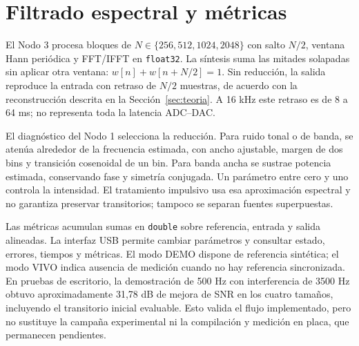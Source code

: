 \section{Filtrado espectral y métricas}
\label{sec:espectral}
El Nodo 3 procesa bloques de $N\in\{256,512,1024,2048\}$ con salto $N/2$,
ventana Hann periódica y FFT/IFFT en \texttt{float32}. La síntesis suma
las mitades solapadas sin aplicar otra ventana: $w[n]+w[n+N/2]=1$.
Sin reducción, la salida reproduce la entrada con retraso de $N/2$ muestras,
de acuerdo con la reconstrucción descrita en la Sección~\ref{sec:teoria}.
A 16 kHz este retraso es de 8 a 64 ms; no representa toda la latencia ADC--DAC.

El diagnóstico del Nodo 1 selecciona la reducción. Para ruido tonal o de banda,
se atenúa alrededor de la frecuencia estimada, con ancho ajustable, margen de
dos bins y transición cosenoidal de un bin. Para banda ancha se sustrae potencia
estimada, conservando fase y simetría conjugada. Un parámetro entre cero y uno
controla la intensidad. El tratamiento impulsivo usa esa aproximación espectral
y no garantiza preservar transitorios; tampoco se separan fuentes superpuestas.

Las métricas acumulan sumas en \texttt{double} sobre referencia, entrada y salida
alineadas. La interfaz USB permite cambiar parámetros y consultar estado,
errores, tiempos y métricas. El modo DEMO dispone de referencia sintética;
el modo VIVO indica ausencia de medición cuando no hay referencia sincronizada.
En pruebas de escritorio, la demostración de 500 Hz con interferencia de
3500 Hz obtuvo aproximadamente 31,78 dB de mejora de SNR en los cuatro tamaños,
incluyendo el transitorio inicial evaluable. Esto valida el flujo implementado,
pero no sustituye la campaña experimental ni la compilación y medición en placa,
que permanecen pendientes.
